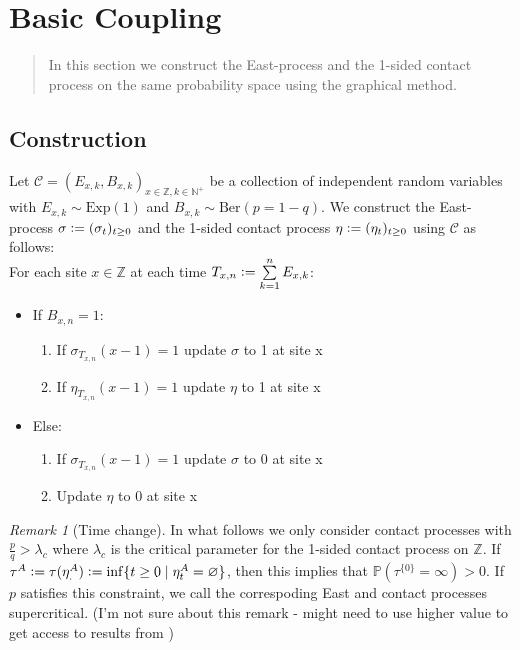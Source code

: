 \documentclass{article}
\theoremstyle{slimTheoremStyle} %
\theoremstyle{slimDefinitionStyle}
\theoremstyle{remark}
\newtheorem{remark}{Remark}[section]
\renewcommand{\cal}[1]{\mathcal{#1}}
\newcommand{\N}{\mathbb{N}}
\newcommand{\Z}{\mathbb{Z}}
\renewcommand{\Pr}[1]{\mathbb{P} \left( #1 \right)}
\newcommand{\dExp}[1]{\text{Exp} \left( #1 \right)}
\newcommand{\dBer}[1]{\text{Ber} \left( #1 \right)}
\newcommand{\defeq}{\vcentcolon=}
\begin{document}
\section{Basic Coupling}
\label{sec:basic_coupling}

\begin{quote}
{\small In this section we construct the East-process and the 1-sided contact process on the same probability space using the graphical method.}
\end{quote}

\subsection{Construction}
Let $\cal{C}=(E_{x,k}, B_{x,k})_{x \in \Z, k \in \N^+}$ be a collection of independent random variables with $E_{x,k} \sim \dExp{1}$ and $B_{x,k} \sim \dBer{p=1-q}$. We construct the East-process $\sigma \defeq (\sigma_t)_{t \geq 0}$ and the 1-sided contact process $\eta \defeq (\eta_t)_{t \geq 0}$ using $\cal{C}$ as follows: \\
For each site $x \in \Z$ at each time $T_{x,n} \defeq \sum\limits_{k=1}^n E_{x,k}$:
\begin{itemize}
  \item If $B_{x,n} = 1$:
  \begin{enumerate}
  	\item If $\sigma_{T_{x,n}} (x-1) = 1$ update $\sigma$ to 1 at site x
  	\item If $\eta_{T_{x,n}} (x-1) = 1$ update $\eta$ to 1 at site x
  \end{enumerate}
  \item Else:
  \begin{enumerate}
  	\item If $\sigma_{T_{x,n}} (x-1) = 1$ update $\sigma$ to 0 at site x
  	\item Update $\eta$ to 0 at site x
  \end{enumerate}
\end{itemize}

\begin{remark}[Time change]\label{rem:time_change}
In what follows we only consider contact processes with $\frac{p}{q} > \lambda_c$ where $\lambda_c$ is the critical parameter for the 1-sided contact process on $\Z$. If $\tau^A \defeq \tau(\eta^A_.) \defeq \inf\{t \geq 0 \mid \eta^A_t = \varnothing \}$, then this implies that $\Pr{\tau^{\{0\}} = \infty} > 0$. If $p$ satisfies this constraint, we call the correspoding East and contact processes supercritical. (I'm not sure about this remark - might need to use higher value to get access to results from \cite{durrett1983supercritical})
\end{remark}
\end{document}
